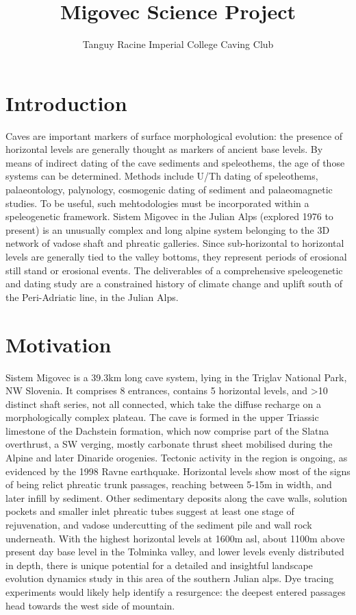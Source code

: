\documentclass[symmetric, a4paper, 11pt]{article}
\title{Migovec Science Project}
\author{Tanguy Racine Imperial College Caving Club}
\begin{document}
\maketitle

\section{Introduction}
Caves are important markers of surface morphological evolution: the presence of  horizontal levels are generally thought as markers of ancient base levels. By means of indirect dating of the cave sediments and speleothems, the age of those systems can be determined. Methods include U/Th dating of speleothems, palaeontology, palynology,  cosmogenic dating of sediment and palaeomagnetic studies. To be useful, such mehtodologies must be incorporated within a speleogenetic framework.  Sistem Migovec  in the Julian Alps (explored 1976 to present) is an unusually complex and long alpine system belonging to the 3D network of vadose shaft and phreatic galleries.  Since sub-horizontal to horizontal levels  are generally tied to the valley bottoms, they represent periods of erosional still stand or  erosional events. The deliverables of a comprehensive speleogenetic and dating study are a constrained history of climate change and uplift south of the Peri-Adriatic line, in the Julian Alps. 

\section{Motivation}
Sistem Migovec is a 39.3km long cave system, lying in the Triglav National Park, NW Slovenia. It comprises 8 entrances, contains 5 horizontal levels,  and >10 distinct shaft series, not all connected, which take the diffuse recharge on a morphologically complex plateau. The cave is formed in the upper Triassic limestone of the Dachstein formation, which now comprise part of the Slatna overthrust, a SW verging, mostly carbonate thrust sheet mobilised during the Alpine and later Dinaride orogenies. Tectonic activity in the region is ongoing, as evidenced by the 1998 Ravne earthquake. Horizontal levels show most of the signs of being relict phreatic trunk passages, reaching between 5-15m in width, and later infill by sediment. Other sedimentary deposits along the cave walls, solution pockets and smaller inlet phreatic tubes  suggest at least one stage of rejuvenation, and vadose undercutting of the sediment pile and wall rock underneath. With the highest horizontal levels at 1600m asl, about 1100m above present day base level in the Tolminka valley, and lower levels evenly distributed in depth, there is  unique potential for a detailed and insightful landscape evolution dynamics study in this area of the southern Julian alps. Dye tracing experiments would likely help identify a resurgence: the deepest entered passages head towards the west side of mountain.
\end{document}
